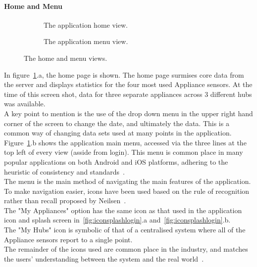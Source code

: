 \documentclass[preprint,12pt,3p]{elsarticle}
\begin{document}
\paragraph{Home and Menu}
\begin{figure}[H]
    \centering
    \begin{subfigure}[t]{0.32\columnwidth}
        \centering
        \caption{The application home view.}
    \end{subfigure}
    \begin{subfigure}[t]{0.32\columnwidth}
        \centering
        \caption{The application menu view.}
    \end{subfigure}
    \caption{The home and menu views.}
    \label{fig:homemenu}
\end{figure}
In figure~\ref{fig:homemenu}.a, the home page is shown. The home page surmises core data from the server and displays statistics for the four most used Appliance sensors. At the time of this screen shot, data for three separate appliances across 3 different hubs was available.\\
A key point to mention is the use of the drop down menu in the upper right hand corner of the screen to change the date, and ultimately the data. This is a common way of changing data sets used at many points in the application.\\
Figure~\ref{fig:homemenu}.b shows the application main menu, accessed via the three lines at the top left of every view (asside from login). This menu is common place in many popular applications on both Android and iOS platforms, adhering to the heuristic of consistency and standards~\cite{nielsen}.\\
The menu is the main method of navigating the main features of the application. To make navigation easier, icons have been used based on the rule of recognition rather than recall proposed by Neilsen~\cite{nielsen}.\\
The "My Appliances" option has the same icon as that used in the application icon and splash screen in~\ref{fig:iconsplashlogin}.a and~\ref{fig:iconsplashlogin}.b.\\ 
The "My Hubs" icon is symbolic of that of a centralised system where all of the Appliance sensors report to a single point.\\ 
The remainder of the icons used are common place in the industry, and matches the users' understanding between the system and the real world~\cite{nielsen}.
\end{document}
